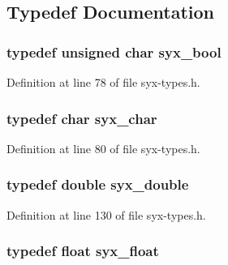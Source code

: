 \subsection{Typedef Documentation}
\hypertarget{syx-types_8h_c6dc09b276b99fa1956364359139daab}{
\subsubsection{\setlength{\rightskip}{0pt plus 5cm}typedef unsigned char {\bf syx\_\-bool}}}
\label{syx-types_8h_c6dc09b276b99fa1956364359139daab}




Definition at line 78 of file syx-types.h.\hypertarget{syx-types_8h_22636fad803dd674d2640c323df20a11}{
\subsubsection{\setlength{\rightskip}{0pt plus 5cm}typedef char {\bf syx\_\-char}}}
\label{syx-types_8h_22636fad803dd674d2640c323df20a11}




Definition at line 80 of file syx-types.h.\hypertarget{syx-types_8h_cc7fcb78741daa005b6897ad40b7472b}{
\subsubsection{\setlength{\rightskip}{0pt plus 5cm}typedef double {\bf syx\_\-double}}}
\label{syx-types_8h_cc7fcb78741daa005b6897ad40b7472b}




Definition at line 130 of file syx-types.h.\hypertarget{syx-types_8h_06247c78a325efbaa525b201c733efdb}{
\subsubsection{\setlength{\rightskip}{0pt plus 5cm}typedef float {\bf syx\_\-float}}}
\label{syx-types_8h_06247c78a325efbaa525b201c733efdb}




